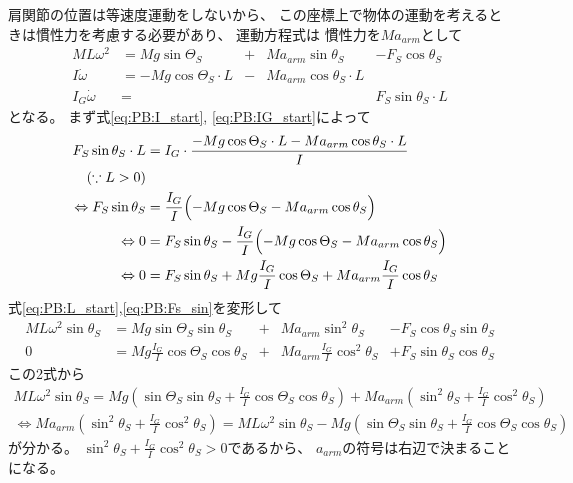 \documentclass[a4paper,11pt]{jsarticle}
\begin{document}
肩関節の位置は等速度運動をしないから、
この座標上で物体の運動を考えるときは慣性力を考慮する必要があり、
運動方程式は
慣性力を$Ma_{arm}$として
\begin{align}
  ML\omega^2 &= Mg\sin\Theta_S &+& Ma_{arm}\sin\theta_S &- F_S\cos\theta_S
  \label{eq:PB:L_start}
  \\
  I\dot\omega &= -Mg\cos\Theta_S \cdot L &-& Ma_{arm}\cos\theta_S \cdot L &
  \label{eq:PB:I_start}
  \\
  I_G\dot\omega &= & & & F_S \sin\theta_S \cdot L
  \label{eq:PB:IG_start}
\end{align}
となる。
まず式\ref{eq:PB:I_start}, \ref{eq:PB:IG_start}によって
\begin{align}
  F_S\sin\theta_S \cdot L 
  & = I_G \cdot \frac{-Mg\cos\Theta_S \cdot L - Ma_{arm}\cos\theta_S \cdot L}{I}
  \\
  \left( \because L > 0 \right) &
  \\
  \Leftrightarrow
  F_S\sin\theta_S
  & = \frac{I_G}{I}\Bigl( -Mg\cos\Theta_S - Ma_{arm}\cos\theta_S \Bigr)
  \\
  \Leftrightarrow
  0
  & = F_S\sin\theta_S - \frac{I_G}{I}\Bigl( -Mg\cos\Theta_S - Ma_{arm}\cos\theta_S \Bigr)
  \\
  \Leftrightarrow
  0
  & = F_S\sin\theta_S + Mg\frac{I_G}{I}\cos\Theta_S + Ma_{arm}\frac{I_G}{I}\cos\theta_S
  \label{eq:PB:Fs_sin}
\end{align}
式\ref{eq:PB:L_start},\ref{eq:PB:Fs_sin}を変形して
\begin{align}
  ML\omega^2 \sin\theta_S &= Mg\sin\Theta_S \sin\theta_S
  &+& Ma_{arm}\sin^2\theta_S 
  &- F_S\cos\theta_S\sin\theta_S
  \\
  0
  &=  Mg\frac{I_G}{I}\cos\Theta_S\cos\theta_S 
  &+& Ma_{arm}\frac{I_G}{I}\cos^2\theta_S 
  &+ F_S\sin\theta_S\cos\theta_S
\end{align}
この2式から
\begin{align}
  ML\omega^2 \sin\theta_S
  = Mg\left( \sin\Theta_S \sin\theta_S + \frac{I_G}{I}\cos\Theta_S \cos\theta_S \right)
  + Ma_{arm}\left( \sin^2\theta_S + \frac{I_G}{I}\cos^2\theta_S \right)
\end{align}
\begin{align}
  \Leftrightarrow
  Ma_{arm}\left( \sin^2\theta_S + \frac{I_G}{I}\cos^2\theta_S \right)
  = ML\omega^2 \sin\theta_S
  - Mg\left( \sin\Theta_S \sin\theta_S + \frac{I_G}{I}\cos\Theta_S \cos\theta_S \right)
  \label{eq:PB:a_arm_end}
\end{align}
が分かる。
$\sin^2\theta_S + \frac{I_G}{I}\cos^2\theta_S > 0$であるから、
$a_{arm}$の符号は右辺で決まることになる。
\end{document}
